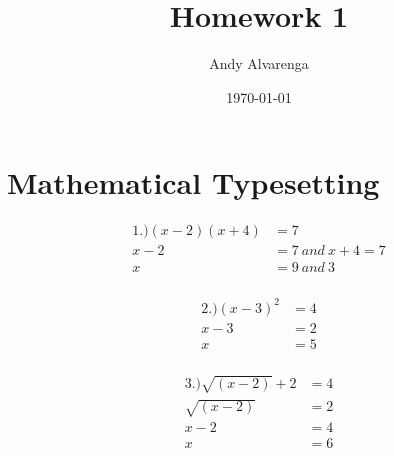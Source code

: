 \documentclass[11pt]{article}
\title{Homework 1}
\author{Andy Alvarenga}
\date{\today}
\begin{document}
	
\maketitle

\section{Mathematical Typesetting}

\begin{align*}
1.) (x - 2)(x + 4) &= 7\\
x - 2 &= 7~and~x + 4 = 7\\
x &= 9~and~3\\
\end{align*}

\begin{align*}
2.) (x - 3)^2 &= 4\\
x - 3 &= 2\\
x &= 5\\
\end{align*}

\begin{align*}
3.) \sqrt{(x - 2)} + 2 &= 4\\
\sqrt{(x - 2)} &= 2\\
x - 2 &= 4\\
x &= 6\\
\end{align*}
\end{document}
